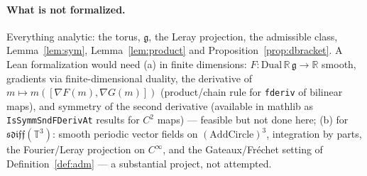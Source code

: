\documentclass[11pt]{article}
\theoremstyle{definition}
\newcommand{\T}{\mathbb{T}^3}
\newcommand{\R}{\mathbb{R}}
\newcommand{\g}{\mathfrak{g}}
\begin{document}
\paragraph{What is not formalized.} Everything analytic: the torus, $\g$, the Leray projection, the
admissible class, Lemma~\ref{lem:sym}, Lemma~\ref{lem:product} and Proposition~\ref{prop:dbracket}. A Lean
formalization would need (a) in finite dimensions: $F:\mathrm{Dual}\,\R\,\g\to\R$ smooth, gradients via
finite-dimensional duality, the derivative of $m\mapsto m([\nabla F(m),\nabla G(m)])$ (product/chain rule for
\texttt{fderiv} of bilinear maps), and symmetry of the second derivative (available in mathlib as
\texttt{IsSymmSndFDerivAt} results for $C^2$ maps) --- feasible but not done here; (b) for
$\mathfrak{sdiff}(\T)$: smooth periodic vector fields on $(\mathrm{AddCircle})^3$, integration by parts, the
Fourier/Leray projection on $C^\infty$, and the Gateaux/Fréchet setting of Definition~\ref{def:adm} ---
a substantial project, not attempted.
\end{document}

